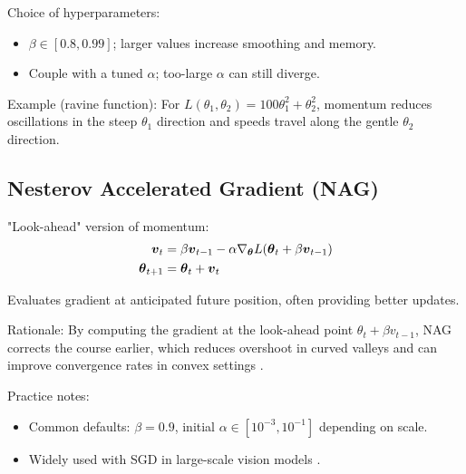 Choice of hyperparameters:
\begin{itemize}
    \item \(\beta\in[0.8,0.99]\); larger values increase smoothing and memory.
    \item Couple with a tuned \(\alpha\); too-large \(\alpha\) can still diverge.
\end{itemize}

Example (ravine function): For \(L(\theta_1,\theta_2)=100\theta_1^2+\theta_2^2\), momentum reduces oscillations in the steep \(\theta_1\) direction and speeds travel along the gentle \(\theta_2\) direction.

\subsection{Nesterov Accelerated Gradient (NAG)}

"Look-ahead" version of momentum:
\begin{align}
\boldsymbol{v}_t &= \beta \boldsymbol{v}_{t-1} - \alpha \nabla_{\boldsymbol{\theta}} L(\boldsymbol{\theta}_t + \beta \boldsymbol{v}_{t-1}) \\
\boldsymbol{\theta}_{t+1} &= \boldsymbol{\theta}_t + \boldsymbol{v}_t
\end{align}

Evaluates gradient at anticipated future position, often providing better updates.

Rationale: By computing the gradient at the look-ahead point \(\theta_t+\beta v_{t-1}\), NAG corrects the course earlier, which reduces overshoot in curved valleys and can improve convergence rates in convex settings \cite{Nesterov1983,WebOptimizationDLBook,GoodfellowEtAl2016}.

Practice notes:
\begin{itemize}
    \item Common defaults: \(\beta=0.9\), initial \(\alpha\in[10^{-3},10^{-1}]\) depending on scale.
    \item Widely used with SGD in large-scale vision models \cite{He2016}.
\end{itemize}

